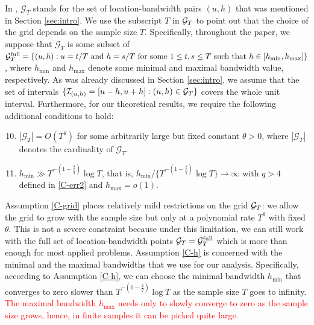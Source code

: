 \documentclass[a4paper,12pt]{article}
\makeatletter
\renewcommand{\eqref}[1]{\tagform@{\ref{#1}}}
\makeatother
\begin{document}
In \eqref{eq:Psi_hat}, $\mathcal{G}_T$ stands for the set of location-bandwidth pairs $(u, h)$ that was mentioned in Section \ref{sec:intro}. We use the subscript $T$ in $\mathcal{G}_T$ to point out that the choice of the grid depends on the sample size $T$. Specifically, throughout the paper, we suppose that $\mathcal{G}_T$ is some subset of $\mathcal{G}_T^{\text{full}} = \{ (u, h): u = t/T \text{ and } h = s/T \text{ for some } 1 \le t, s \le T \text{ such that } \linebreak h \in [h_{\min},h_{\max}] \}$, where $h_{\min}$ and $h_{\max}$ denote some minimal and maximal bandwidth value, respectively. As was already discussed in Section \ref{sec:intro}, we assume that the set of intervals $\{\mathcal{I}_{(u, h)} = [u-h, u+h]: (u, h) \in \mathcal{G}_T\}$ covers the whole unit interval. Furthermore, for our theoretical results, we require the following additional conditions to hold:
\begin{enumerate}[label=(C\arabic*),leftmargin=1.05cm]
\setcounter{enumi}{9}

\item \label{C-grid} $|\mathcal{G}_T| = O(T^\theta)$ for some arbitrarily large but fixed constant $\theta > 0$, where $|\mathcal{G}_T|$ denotes the cardinality of $\mathcal{G}_T$. 

\item \label{C-h} $h_{\min} \gg T^{-(1-\frac{2}{q})} \log T$, that is, $h_{\min} / \{ T^{-(1-\frac{2}{q})} \log T \} \rightarrow \infty$ with $q > 4$ defined in \ref{C-err2} and $h_{\max} = o(1)$.

\end{enumerate}
Assumption \ref{C-grid} places relatively mild restrictions on the grid $\mathcal{G}_T$: we allow the grid to grow with the sample size but only at a polynomial rate $T^\theta$ with fixed $\theta$. This is not a severe constraint because under this limitation, we can still work with the full set of location-bandwidth points $\mathcal{G}_T = \mathcal{G}_T^{\text{full}}$ which is more than enough for most applied problems. Assumption \ref{C-h} is concerned with the minimal and the maximal bandwidths that we use for our analysis. Specifically, according to Assumption \ref{C-h}, we can choose the minimal bandwidth $h_{\min}$ that converges to zero slower than $T^{-(1-\frac{2}{q})} \log T$ as the sample size $T$ goes to infinity. \textcolor{red}{The maximal bandwidth $h_{\max}$ needs only to slowly converge to zero as the sample size grows, hence, in finite samples it can be picked quite large.}
\end{document}
